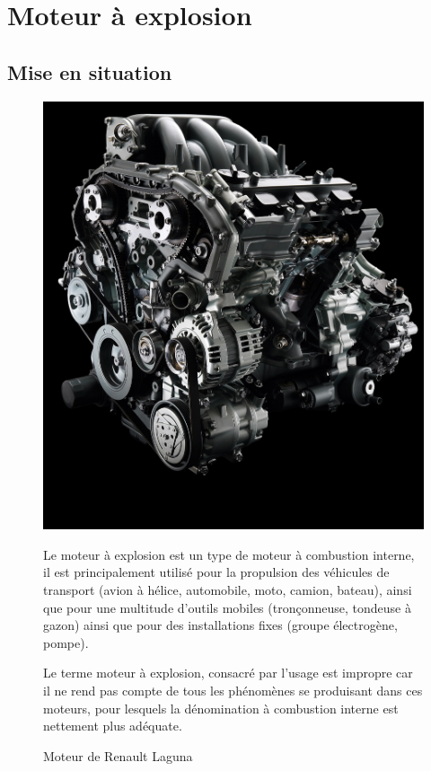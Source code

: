 

\section{Moteur à explosion}

\subsection{Mise en situation}

\begin{figure}[htbp]
\begin{minipage}[c]{.4\linewidth}
\begin{center}
\includegraphics[width=\linewidth]{img/moteur_laguna.jpg}
\caption{Moteur de Renault Laguna}
\label{fig:image8}
\end{center}
\end{minipage}
\hfill
\begin{minipage}[c]{.55\linewidth}
Le moteur à explosion est un type de moteur à combustion interne, il est principalement utilisé pour la propulsion des véhicules de transport (avion à hélice, automobile, moto, camion, bateau), ainsi que pour une multitude d'outils mobiles (tronçonneuse, tondeuse à gazon) ainsi que pour des installations fixes (groupe électrogène, pompe).

Le terme moteur à explosion, consacré par l'usage est impropre car il ne rend pas compte de tous les phénomènes se produisant dans ces moteurs, pour lesquels la dénomination à combustion interne est nettement plus adéquate.
\end{minipage}
\end{figure}

